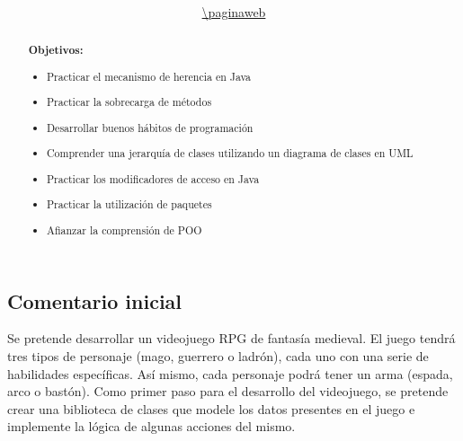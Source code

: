 \documentclass[english,a4paper,11pt]{article}
\title{\asignatura \\ \titulo}
\author{\institucion \\ \url{\paginaweb}}
\date{\fecha}
\newcommand{\parrafosseparados}{\setlength{\parskip}{1.5ex plus 0.6ex minus 0.5ex}}
\begin{document}

\renewcommand{\tablename}{Tabla}                  %
\renewcommand{\listtablename}{Indice de tablas}

\maketitle              %
\thispagestyle{empty}   %

\renewcommand{\abstractname}{}         %
\begin{abstract}                       %
\noindent \textbf{Objetivos:}
\begin{itemize}
\item Practicar el mecanismo de herencia en Java
\item Practicar la sobrecarga de métodos
\item Desarrollar buenos hábitos de programación
\item Comprender una jerarquía de clases utilizando un diagrama de clases en UML
\item Practicar los modificadores de acceso en Java
\item Practicar la utilización de paquetes
\item Afianzar la comprensión de POO
\end{itemize}
\end{abstract}

\sloppy              %

\parrafosseparados   %

\subsection*{Comentario inicial}
Se pretende desarrollar un videojuego RPG de fantasía medieval. El juego tendrá tres tipos de personaje (mago, guerrero o ladrón), cada uno con una serie de habilidades específicas. Así mismo, cada personaje podrá tener un arma (espada, arco o bastón). Como primer paso para el desarrollo del videojuego, se pretende crear una biblioteca de clases que modele los datos presentes en el juego e implemente la lógica de algunas acciones del mismo.
\end{document}
